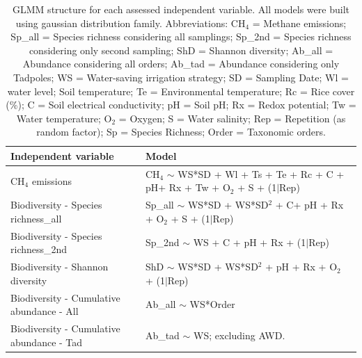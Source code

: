 \begin{table}[htbp]
    \scriptsize %
    \renewcommand{\arraystretch}{0.9} %
    \centering
\begin{tabularx}{\textwidth}{l X}
    \toprule
Independent variable & Model\\
       \midrule 
    CH$_{4}$ emissions & CH$_{4}$ $\sim$ WS*SD + Wl + Ts + Te + Rc + C + pH+ Rx + Tw + O$_{2}$ + S + (1$\mid$Rep) \\
    Biodiversity - Species richness\_all & Sp\_all $\sim$ WS*SD + WS*SD$^2$ + C+ pH + Rx + O$_{2}$ + S + (1$\mid$Rep) \\
    Biodiversity - Species richness\_2nd & Sp\_2nd $\sim$ WS + C + pH + Rx + (1$\mid$Rep) \\
    Biodiversity - Shannon diversity & ShD $\sim$ WS*SD + WS*SD$^2$ + pH + Rx + O$_{2}$ + (1$\mid$Rep) \\
    Biodiversity - Cumulative abundance - All & Ab\_all $\sim$ WS*Order \\
    Biodiversity - Cumulative abundance - Tad & Ab\_tad $\sim$ WS; excluding AWD. \\
    \bottomrule
\end{tabularx}
    \caption{GLMM structure for each assessed independent variable. All models were built using gaussian distribution family. Abbreviations: CH$_{4}$ = Methane emissions; Sp\_all = Species richness considering all samplings; Sp\_2nd = Species richness considering only second sampling; ShD = Shannon diversity; Ab\_all = Abundance considering all orders; Ab\_tad = Abundance considering only Tadpoles; WS = Water-saving irrigation strategy; SD = Sampling Date; Wl = water level; Soil temperature; Te = Environmental temperature; Rc = Rice cover (\%); C = Soil electrical conductivity; pH = Soil pH; Rx = Redox potential; Tw = Water temperature; O$_{2}$ = Oxygen; S = Water salinity; Rep = Repetition (as random factor); Sp = Species Richness;  Order = Taxonomic orders.}
    \label{mod_str}
\end{table}



